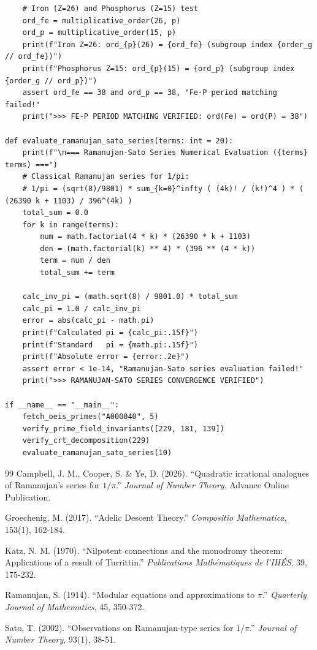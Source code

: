 \begin{verbatim}
    # Iron (Z=26) and Phosphorus (Z=15) test
    ord_fe = multiplicative_order(26, p)
    ord_p = multiplicative_order(15, p)
    print(f"Iron Z=26: ord_{p}(26) = {ord_fe} (subgroup index {order_g // ord_fe})")
    print(f"Phosphorus Z=15: ord_{p}(15) = {ord_p} (subgroup index {order_g // ord_p})")
    assert ord_fe == 38 and ord_p == 38, "Fe-P period matching failed!"
    print(">>> FE-P PERIOD MATCHING VERIFIED: ord(Fe) = ord(P) = 38")

def evaluate_ramanujan_sato_series(terms: int = 20):
    print(f"\n=== Ramanujan-Sato Series Numerical Evaluation ({terms} terms) ===")
    # Classical Ramanujan series for 1/pi:
    # 1/pi = (sqrt(8)/9801) * sum_{k=0}^infty ( (4k)! / (k!)^4 ) * ( (26390 k + 1103) / 396^(4k) )
    total_sum = 0.0
    for k in range(terms):
        num = math.factorial(4 * k) * (26390 * k + 1103)
        den = (math.factorial(k) ** 4) * (396 ** (4 * k))
        term = num / den
        total_sum += term
    
    calc_inv_pi = (math.sqrt(8) / 9801.0) * total_sum
    calc_pi = 1.0 / calc_inv_pi
    error = abs(calc_pi - math.pi)
    print(f"Calculated pi = {calc_pi:.15f}")
    print(f"Standard   pi = {math.pi:.15f}")
    print(f"Absolute error = {error:.2e}")
    assert error < 1e-14, "Ramanujan-Sato series evaluation failed!"
    print(">>> RAMANUJAN-SATO SERIES CONVERGENCE VERIFIED")

if __name__ == "__main__":
    fetch_oeis_primes("A000040", 5)
    verify_prime_field_invariants([229, 181, 139])
    verify_crt_decomposition(229)
    evaluate_ramanujan_sato_series(10)
\end{verbatim}

\vspace{2em}
\begin{thebibliography}{99}
Campbell, J. M., Cooper, S. \& Ye, D. (2026).
``Quadratic irrational analogues of Ramanujan's series for $1/\pi$.''
\textit{Journal of Number Theory}, Advance Online Publication.

Groechenig, M. (2017).
``Adelic Descent Theory.''
\textit{Compositio Mathematica}, 153(1), 162-184.

Katz, N. M. (1970).
``Nilpotent connections and the monodromy theorem: Applications of a result of Turrittin.''
\textit{Publications Mathématiques de l'IHÉS}, 39, 175-232.

Ramanujan, S. (1914).
``Modular equations and approximations to $\pi$.''
\textit{Quarterly Journal of Mathematics}, 45, 350-372.

Sato, T. (2002).
``Observations on Ramanujan-type series for $1/\pi$.''
\textit{Journal of Number Theory}, 93(1), 38-51.
\end{thebibliography}
